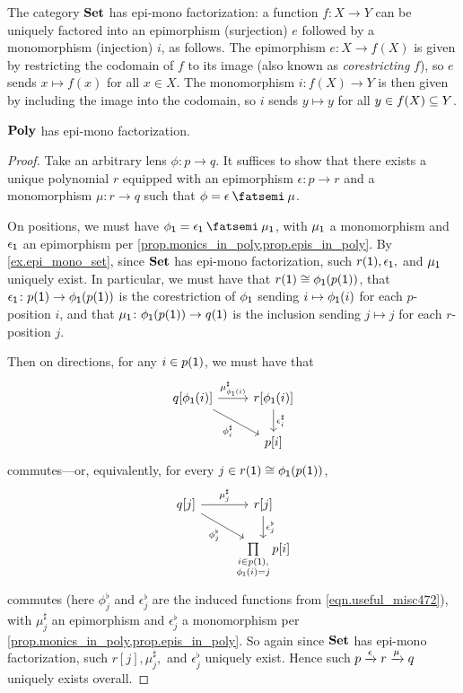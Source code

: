 \documentclass[Book-Poly]{subfiles}
\begin{document}
\begin{example} \label{ex.epi_mono_set}
The category $\smset$ has epi-mono factorization: a function $f\colon X\to Y$ can be uniquely factored into an epimorphism (surjection) $e$ followed by a monomorphism (injection) $i$, as follows.
The epimorphism $e\colon X\to f(X)$ is given by restricting the codomain of $f$ to its image (also known as \emph{corestricting} $f$), so $e$ sends $x\mapsto f(x)$ for all $x\in X$.
The monomorphism $i\colon f(X)\to Y$ is then given by including the image into the codomain, so $i$ sends $y\mapsto y$ for all $y\in f(X)\ss Y$.
\end{example}

\begin{proposition}
$\poly$ has epi-mono factorization.
\end{proposition}
\begin{proof}
Take an arbitrary lens $\phi\colon p\to q$.
It suffices to show that there exists a unique polynomial $r$ equipped with an epimorphism $\epsilon\colon p\to r$ and a monomorphism $\mu\colon r\to q$ such that $\phi=\epsilon\then\mu$.

On positions, we must have $\phi_\1 = \epsilon_\1\then\mu_\1$, with $\mu_\1$ a monomorphism and $\epsilon_\1$ an epimorphism per \cref{prop.monics_in_poly,prop.epis_in_poly}.
By \cref{ex.epi_mono_set}, since $\smset$ has epi-mono factorization, such $r(\1), \epsilon_\1,$ and $\mu_\1$ uniquely exist.
In particular, we must have that $r(\1)\iso \phi_\1(p(\1))$, that $\epsilon_\1\colon p(\1)\to\phi_\1(p(\1))$ is the corestriction of $\phi_\1$ sending $i\mapsto\phi_\1(i)$ for each $p$-position $i$, and that $\mu_\1\colon\phi_\1(p(\1))\to q(\1)$ is the inclusion sending $j\mapsto j$ for each $r$-position $j$.

Then on directions, for any $i\in p(\1)$, we must have that
\[
\begin{tikzcd}
    q[\phi_\1(i)] \ar[r, "\mu^\sharp_{\phi_\1(i)}"] \ar[dr, "\phi^\sharp_i"'] & r[\phi_\1(i)] \ar[d, "\epsilon^\sharp_i"] \\
    & p[i]
\end{tikzcd}
\]
commutes---or, equivalently, for every $j\in r(\1)\iso\phi_\1(p(\1))$,
\[
\begin{tikzcd}
    q[j] \ar[r, "\mu^\sharp_j"] \ar[dr, "\phi^\flat_j"'] & r[j] \ar[d, "\epsilon^\flat_j"] \\
    & \prod\limits_{\substack{i\in p(\1), \\ \phi_\1(i)=j}} p[i]
\end{tikzcd}
\]
commutes (here $\phi^\flat_j$ and $\epsilon^\flat_j$ are the induced functions from \eqref{eqn.useful_misc472}), with $\mu_j^\sharp$ an epimorphism and $\epsilon^\flat_j$ a monomorphism per
\cref{prop.monics_in_poly,prop.epis_in_poly}.
So again since $\smset$ has epi-mono factorization, such $r[j], \mu^\sharp_j,$ and $\epsilon^\flat_j$ uniquely exist.
Hence such $p \To{\epsilon} r \To{\mu} q$ uniquely exists overall.
\end{proof}
\end{document}
